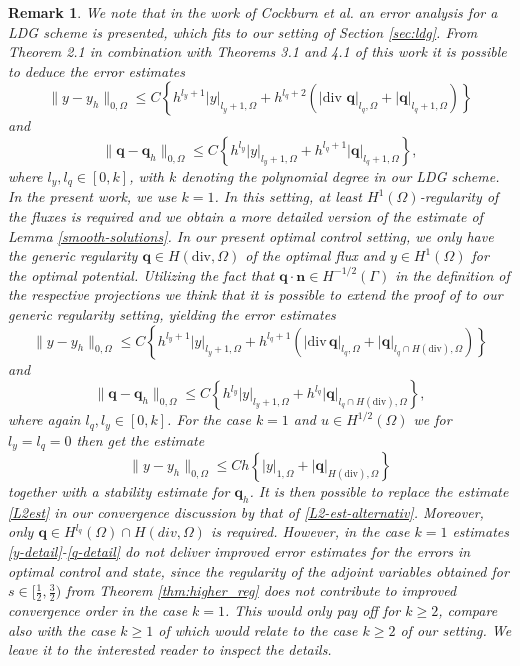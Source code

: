 \documentclass[a4paper,10pt]{article}
\newcommand{\bq}{{\mathbf{q}}}
\newcommand{\bn}{{\mathbf{n}}}
\newtheorem{remark}[theorem]{Remark}
\numberwithin{theorem}{section}
\begin{document}
\begin{remark}\label{Cockburn-extension}
We note that in the work of Cockburn et al. \cite{BCockburn_JGopalakrishnan_FJSayas_2010} an error analysis for a LDG scheme is presented, which fits to our setting of Section \ref{sec:ldg}. From Theorem 2.1 in combination with Theorems 3.1 and 4.1 of this work it is possible to deduce the error estimates
\[
\|y-y_h\|_{0,\Omega}\le C\left\{ h^{l_y+1}|y|_{l_{y}+1,\Omega} + h^{l_q+2} (|\text{div } \bq|_{l_q,\Omega}+|\bq|_{l_q+1, \Omega})\right\}
\]
and
\[
\|\bq-\bq_h\|_{0,\Omega}\le C\left\{ h^{l_y}|y|_{l_{y}+1,\Omega} + h^{l_q+1} |\bq|_{l_q+1,\Omega}\right\},
\]
where $l_y,l_q \in [0,k]$, with $k$ denoting the polynomial degree in our LDG scheme. In the present work, we use $k=1$. In this setting, at least $H^1(\Omega)$-regularity of the fluxes is required and we obtain a more detailed version of the estimate of Lemma \ref{smooth-solutions}. In our present optimal control setting, we only have the generic regularity $\bq\in H(\mathrm{div},\Omega)$ of the optimal flux and $y\in H^1(\Omega)$ for the optimal potential. Utilizing the fact that $\bq \cdot \bn \in H^{-1/2}(\Gamma)$ in the definition of the respective projections we think that it is possible to extend the proof of \cite[Theorem 2.1]{BCockburn_JGopalakrishnan_FJSayas_2010} to our generic regularity setting, yielding the error estimates
\begin{equation}\label{y-detail}
\|y-y_h\|_{0,\Omega}\le C\left\{ h^{l_y+1}|y|_{l_{y}+1,\Omega} + h^{l_q+1} (|\mathrm{div} \, \bq|_{l_q, \Omega}+|\bq|_{l_{q}\cap H(\mathrm{div}),\Omega})\right\}
\end{equation}
and 
\begin{equation}\label{q-detail}
\|\bq-\bq_h\|_{0,\Omega}\le C\left\{ h^{l_y}|y|_{l_{y}+1,\Omega} + h^{l_q} |\bq|_{l_{q}\cap H(\mathrm{div}),\Omega}\right\},
\end{equation}
where again $l_q,l_y\in [0,k]$. For the case $k=1$ and $u\in H^{1/2}(\Omega)$ we for $l_y=l_q=0$ then get the estimate
\begin{equation}\label{L2-est-alternativ}
\|y-y_h\|_{0,\Omega}\le C h\left\{|y|_{1,\Omega} +|\bq|_{ H(\mathrm{div}),\Omega}\right\}
\end{equation}
together with a stability estimate for $\bq_h$. It is then possible to replace the estimate \eqref{L2est} in our convergence discussion by that of \eqref{L2-est-alternativ}. Moreover, only $\bq\in H^{l_q}(\Omega)\cap H(div,\Omega)$ is required. However, in the case $k=1$ estimates \eqref{y-detail}-\eqref{q-detail} do not deliver improved error estimates for the errors in optimal control and state, since the regularity of the adjoint variables obtained for $s\in [\frac{1}{2},\frac{3}{2})$ from Theorem \ref{thm:higher_reg} does not contribute to improved convergence order in the case $k=1$. This would only pay off for $k\ge 2$, compare also with the case $k\ge 1$ of \cite{WGong_WHu_MMateos_JSingler_XZhang_YZhang_2018} which would relate to the case $k\ge 2$ of our setting. We leave it to the interested reader to inspect the details.
\end{remark}
\end{document}
